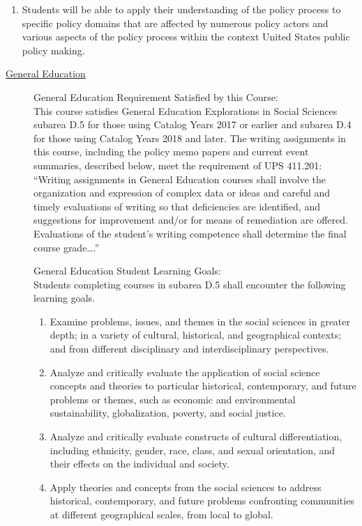 \documentclass[11pt]{article}
\begin{document}
\begin{description}
\begin{enumerate}
	   		 \item Students will be able to apply their understanding of the policy process to specific policy domains that are affected by numerous policy actors and  various aspects of the policy process within the context United States public policy making. 
	   		\end{enumerate}

\item \underline{General Education}
	\begin{description}
		\item[]General Education Requirement Satisfied by this Course: \\ This course satisfies General Education Explorations in Social Sciences subarea D.5 for those using Catalog Years 2017 or earlier and subarea D.4 for those using Catalog Years 2018 and later. The writing assignments in this course, including the policy memo papers and current event summaries, described below, meet the requirement of UPS 411.201: ``Writing assignments in General Education courses shall involve the organization and expression of complex data or ideas and careful and timely evaluations of writing so that deficiencies are identified, and suggestions for improvement and/or for means of remediation are offered. Evaluations of the student’s writing competence shall determine the final course grade\ldots.''
		
		\item[] General Education Student Learning Goals: \\ Students completing courses in subarea D.5 shall encounter the following learning goals.
			\begin{enumerate}
				\item Examine problems, issues, and themes in the social sciences in greater depth; in a variety of cultural, historical, and geographical contexts; and from different disciplinary and interdisciplinary perspectives.
				\item Analyze and critically evaluate the application of social science concepts and theories to particular historical, contemporary, and future problems or themes, such as economic and environmental sustainability, globalization, poverty, and social justice.
				\item Analyze and critically evaluate constructs of cultural differentiation, including ethnicity, gender, race, class, and sexual orientation, and their effects on the individual and society. 
				\item Apply theories and concepts from the social sciences to address historical, contemporary, and future problems confronting communities at different geographical scales, from local to global.
			\end{enumerate}
	\end{description}
			

\end{description}
\end{document}

